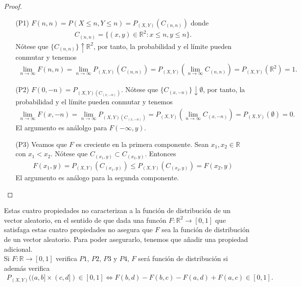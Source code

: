 \begin{proof}
\begin{enumerate}
    \item[(P1)] $F(n,n) = P(X \leq n, Y \leq n) = P_{(X,Y)}(C_{(n,n)})$ donde
    \begin{align*}
        C_{(n,n)} = \{ (x,y) \in \mathbb{R}^2 : x \leq n, y \leq n\}.
    \end{align*}
    Nótese que $\{C_{(n,n)} \} \uparrow \mathbb{R}^2$, por tanto, la probabilidad y el límite pueden conmutar y tenemos
    \begin{align*}
        \lim_{n \to \infty}{F(n,n)} = \lim_{n \to \infty}{ P_{(X,Y)}(C_{(n,n)})} = P_{(X,Y)}(\lim_{n \to \infty}{C_{(n,n)}}) = P_{(X,Y)}(\mathbb{R}^2) = 1.
    \end{align*}
    \item[(P2)] $F(0,-n) = P_{(X,Y)(C_{(x,-n)})}$. Nótese que $\{C_{(x,-n)}\} \downarrow \emptyset$, por tanto, la probabilidad y el límite pueden conmutar y tenemos
    \begin{align*}
        \lim_{n \to \infty}{F(x,-n)} = \lim_{n \to \infty}{P_{(X,Y)(C_{(x,-n)})}} = P_{(X,Y)}{(\lim_{n \to \infty}{C_{(x,-n)}})} = P_{(X,Y)}{(\emptyset)} = 0.
    \end{align*}
    El argumento es análolgo para $F(-\infty,y)$.
    \item[(P3)] Veamos que $F$ es creciente en la primera componente. Sean $x_1, x_2 \in \mathbb{R}$ con $x_1 < x_2$. Nótese que $C_{(x_1,y)} \subset C_{(x_2,y)}$. Entonces
    \begin{align*}
        F(x_1,y) = P_{(X,Y)}(C_{(x_1,y)}) \leq P_{(X,Y)}(C_{(x_2,y)}) = F(x_2,y)
    \end{align*}
    El argumento es análogo para la segunda componente.
\end{enumerate}

\end{proof}

\begin{obs}
Estas cuatro propiedades no caracterizan a la función de distribución de un vector aleatorio, en el sentido de que dada una funcón $F: \mathbb{R}^2 \longrightarrow [0,1]$ que satisfaga estas cuatro propiedades no asegura que $F$ sea la función de distribución de un vector aleatorio. Para poder asegurarlo, tenemos que añadir una propiedad adicional.
\\
\newline
Si $F: \mathbb{R} \longrightarrow [0,1]$ verifica $P1$, $P2$, $P3$ y $P4$, $F$ será función de distribución si además verifica
\begin{align*}
    P_{(X,Y)}((a,b] \times (c,d]) \in [0,1] \Longleftrightarrow F(b,d) - F(b,c) - F(a,d) + F(a,c) \in [0,1].
\end{align*}
\end{obs}

